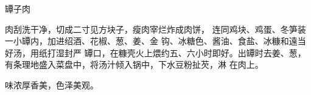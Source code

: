 \begin{recipe}{罈子肉}

\ingredients






\cooking

肉刮洗干净，切成二寸见方块子，瘦肉宰烂炸成肉饼， 连同鸡块、鸡蛋、冬笋装一小罈内，加进绍酒、花椒、葱、姜、金 钩、冰糖色、酱油、食盐、冰糠和遠当好汤，用纸打湿封严 罈口，在糠壳火上煨约五、六小时即好。出罈时去姜、葱， 有条理地盛入菜盘中，将汤汁倾入锅中，下水豆粉扯芡，淋 在肉上。

\notes

味浓厚香美，色泽美观。

\end{recipe}

